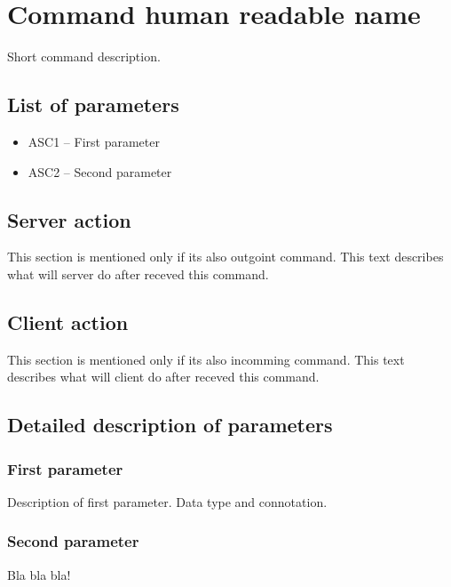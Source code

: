 \chapter{Command human readable name}

Short command description.

\section{List of parameters}


\begin{itemize}
	\item ASC1 -- First parameter
	\item ASC2 -- Second parameter
\end{itemize}

\section{Server action}

This section is mentioned only if its also outgoint command. This text describes what will server do after receved this command.

\section{Client action}

This section is mentioned only if its also incomming command. This text describes what will client do after receved this command.

\section{Detailed description of parameters}

\subsection{First parameter}

Description of first parameter. Data type and connotation.

\subsection{Second parameter}

Bla bla bla!